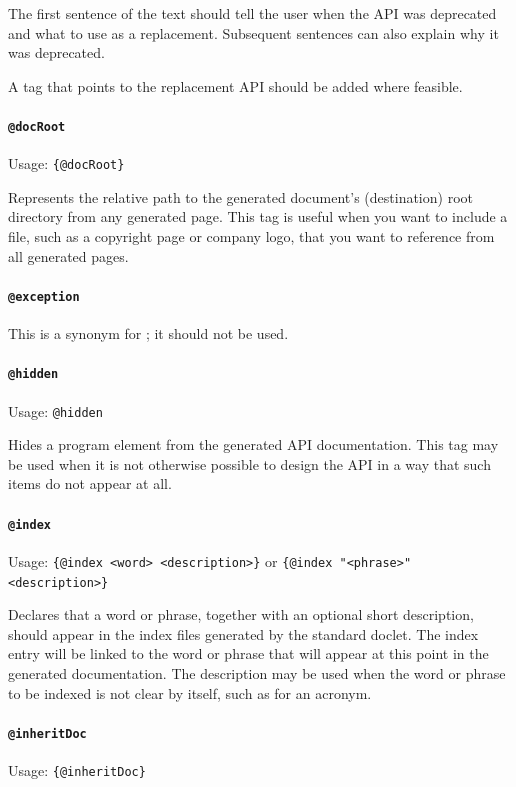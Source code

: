 \documentclass[11pt,a4paper, titlepage, parskip=half, headsepline, footsepline, cleardoublepage=current, headheight=1cm]{scrbook}
\begin{document}
The first sentence of the text should tell the user when the API was deprecated and what to use as a replacement. Subsequent sentences can also explain why it was deprecated.

A  tag that points to the replacement API should be added where feasible.

\paragraph{\lstinline|@docRoot|}  Usage: \lstinline|{@docRoot}|

Represents the relative path to the generated document's (destination) root directory from any generated page. This tag is useful when you want to include a file, such as a copyright page or company logo, that you want to reference from all generated pages.

\paragraph{\lstinline|@exception|} This is a synonym for ; it should not be used.

\paragraph{\lstinline|@hidden|}  Usage: \lstinline|@hidden|

Hides a program element from the generated API documentation. This tag may be used when it is not otherwise possible to design the API in a way that such items do not appear at all.

\paragraph{\lstinline|@index|}  Usage: \lstinline|{@index <word> <description>}| or \lstinline|{@index "<phrase>" <description>}|

Declares that a word or phrase, together with an optional short description, should appear in the index files generated by the standard doclet. The index entry will be linked to the word or phrase that will appear at this point in the generated documentation. The description may be used when the word or phrase to be indexed is not clear by itself, such as for an acronym.

\paragraph{\lstinline|@inheritDoc|}\label{sec:TagInheritDoc}  Usage: \lstinline|{@inheritDoc}|
\end{document}
